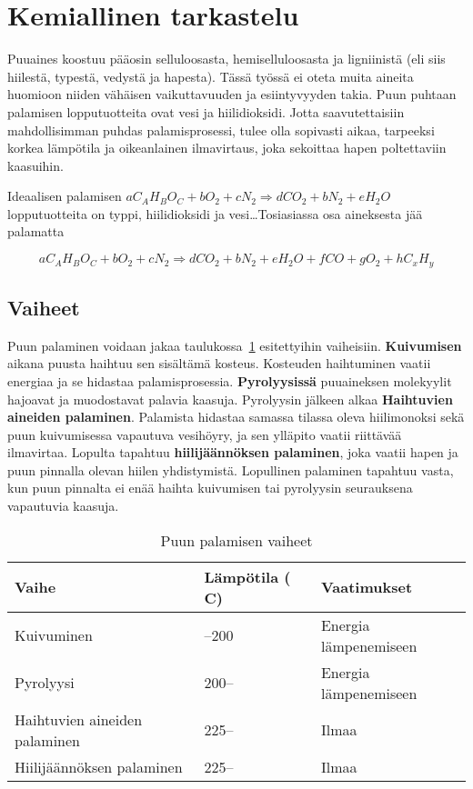 \section{Kemiallinen tarkastelu}

Puuaines koostuu pääosin selluloosasta, hemiselluloosasta ja ligniinistä
(eli siis hiilestä, typestä, vedystä ja hapesta). Tässä työssä ei
oteta muita aineita huomioon niiden vähäisen vaikuttavuuden ja esiintyvyyden takia.
Puun puhtaan palamisen lopputuotteita ovat vesi ja hiilidioksidi.
Jotta saavutettaisiin mahdollisimman puhdas palamisprosessi, tulee olla sopivasti
aikaa, tarpeeksi korkea lämpötila ja oikeanlainen ilmavirtaus, joka sekoittaa hapen
poltettaviin kaasuihin.

Ideaalisen palamisen
\(a C_A H_B O_C + bO_2 + cN_2 \Rightarrow dCO_2 + bN_2 + eH_2O\) lopputuotteita on
typpi, hiilidioksidi ja vesi\ldots Tosiasiassa osa aineksesta jää palamatta

\begin{equation}
	a C_A H_B O_C + bO_2 + cN_2 \Rightarrow dCO_2 + bN_2 + eH_2O + fCO + gO_2 + hC_x H_y
\end{equation}

\subsection{Vaiheet}

Puun palaminen voidaan jakaa taulukossa~\ref{table:vaiheet} esitettyihin vaiheisiin.
\textbf{Kuivumisen} aikana puusta haihtuu sen sisältämä kosteus. Kosteuden haihtuminen
vaatii energiaa ja se hidastaa palamisprosessia. \textbf{Pyrolyysissä} puuaineksen
molekyylit hajoavat ja muodostavat palavia kaasuja. Pyrolyysin jälkeen alkaa
\textbf{Haihtuvien aineiden palaminen}. Palamista hidastaa samassa tilassa oleva
hiilimonoksi sekä puun kuivumisessa vapautuva vesihöyry, ja sen ylläpito vaatii
riittävää ilmavirtaa. Lopulta tapahtuu \textbf{hiilijäännöksen palaminen},
joka vaatii hapen ja puun pinnalla olevan hiilen yhdistymistä. Lopullinen palaminen
tapahtuu vasta, kun puun pinnalta ei enää haihta kuivumisen tai pyrolyysin seurauksena
vapautuvia kaasuja.

\begin{table}[H]
	\caption{Puun palamisen vaiheet}
	\label{table:vaiheet}
	\begin{tabular*}{\textwidth}{lll}
		\toprule
		\bf Vaihe & \bf Lämpötila (\textdegree{} C) & \bf Vaatimukset \\
		\midrule
		Kuivuminen & --200 & Energia lämpenemiseen \\
		Pyrolyysi & 200-- & Energia lämpenemiseen \\
		Haihtuvien aineiden palaminen & 225-- & Ilmaa \\
		Hiilijäännöksen palaminen & 225-- & Ilmaa \\
		\bottomrule
	\end{tabular*}
\end{table}

